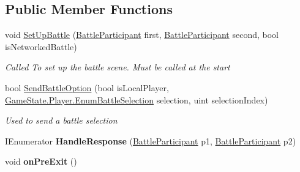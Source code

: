 \subsection*{Public Member Functions}
\begin{DoxyCompactItemize}
\item 
void \hyperlink{group__client_ga380a371e96df1b362027a8f33c8ed7fb}{Set\-Up\-Battle} (\hyperlink{class_battle_participant}{Battle\-Participant} first, \hyperlink{class_battle_participant}{Battle\-Participant} second, bool is\-Networked\-Battle)
\begin{DoxyCompactList}\small\item\em Called To set up the battle scene. Must be called at the start \end{DoxyCompactList}\item 
bool \hyperlink{group__client_gad207e2adf6f1f3882e98b1c8a5f59f67}{Send\-Battle\-Option} (bool is\-Local\-Player, \hyperlink{class_game_state_1_1_player_a9f54c5eca1e60acbaa2074e981f51615}{Game\-State.\-Player.\-Enum\-Battle\-Selection} selection, uint selection\-Index)
\begin{DoxyCompactList}\small\item\em Used to send a battle selection \end{DoxyCompactList}\item 
\hypertarget{group__client_gad69bfcfc81caec50b1db97edb95e33b1}{I\-Enumerator {\bfseries Handle\-Response} (\hyperlink{class_battle_participant}{Battle\-Participant} p1, \hyperlink{class_battle_participant}{Battle\-Participant} p2)}\label{group__client_gad69bfcfc81caec50b1db97edb95e33b1}

\item 
\hypertarget{group__client_ga13610e1414fd1f866292588574c96139}{void {\bfseries on\-Pre\-Exit} ()}\label{group__client_ga13610e1414fd1f866292588574c96139}

\end{DoxyCompactItemize}
